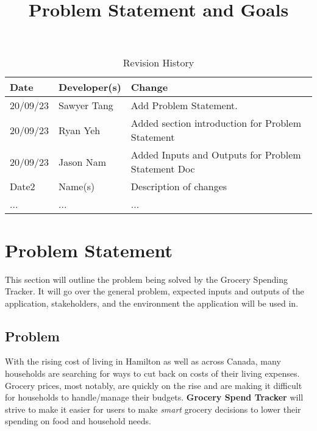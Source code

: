 \documentclass{article}
\title{Problem Statement and Goals\\\progname}
\author{\authname}
\date{}
\begin{document}
\maketitle

\begin{table}[hp]
\caption{Revision History} \label{TblRevisionHistory}
\begin{tabularx}{\textwidth}{llX}
\toprule
\textbf{Date} & \textbf{Developer(s)} & \textbf{Change}\\
\midrule
20/09/23 & Sawyer Tang & Add Problem Statement.\\
20/09/23 & Ryan Yeh & Added section introduction for Problem Statement\\
20/09/23 & Jason Nam & Added Inputs and Outputs for Problem Statement Doc\\
Date2 & Name(s) & Description of changes\\
... & ... & ...\\
\bottomrule
\end{tabularx}
\end{table}

\section{Problem Statement}


This section will outline the problem being solved by the Grocery Spending Tracker. It will go
over the general problem, expected inputs and outputs of the application, stakeholders, and the environment
the application will be used in.

\subsection{Problem}

With the rising cost of living in Hamilton as well as across Canada, many households are searching for ways to cut back on costs of their living expenses. Grocery prices, most notably, are quickly on the rise and are making it difficult for households to handle/manage their budgets. \textbf{Grocery Spend Tracker} will strive to make it easier for users to make \textit{smart} grocery decisions to lower their spending on food and household needs.
\end{document}
